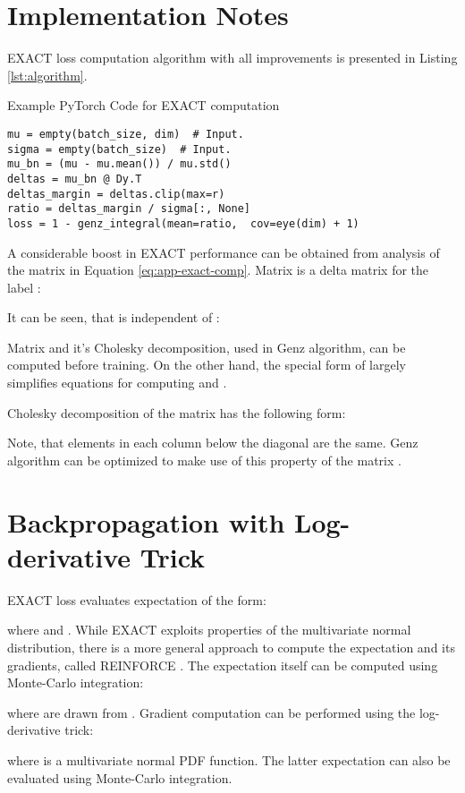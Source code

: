 \documentclass[nohyperref]{article}
\theoremstyle{plain}
\theoremstyle{definition}
\theoremstyle{remark}
\begin{document}
\section{Implementation Notes}
EXACT loss computation algorithm with all improvements is presented in Listing \ref{lst:algorithm}.



\begin{listing}[h]\caption{Example PyTorch Code for EXACT computation}\label{lst:algorithm}\begin{lstlisting}
mu = empty(batch_size, dim)  # Input.
sigma = empty(batch_size)  # Input.
mu_bn = (mu - mu.mean()) / mu.std()
deltas = mu_bn @ Dy.T
deltas_margin = deltas.clip(max=r)
ratio = deltas_margin / sigma[:, None]
loss = 1 - genz_integral(mean=ratio,  cov=eye(dim) + 1)
\end{lstlisting}
\end{listing}


A considerable boost in EXACT performance can be obtained from analysis of the matrix  in Equation \ref{eq:app-exact-comp}. Matrix  is a delta matrix for the label :

It can be seen, that  is independent of :

Matrix  and it's Cholesky decomposition, used in Genz algorithm, can be computed before training. On the other hand, the special form of  largely simplifies equations for computing  and .

Cholesky decomposition of the matrix  has the following form:

Note, that elements in each column below the diagonal are the same. Genz algorithm can be optimized to make use of this property of the matrix .

\section{Backpropagation with Log-derivative Trick}

EXACT loss evaluates expectation of the form:

where  and .
While EXACT exploits properties of the multivariate normal distribution, there is a more general approach to compute the expectation and its gradients, called REINFORCE \cite{williams1992reinforce}. The expectation itself can be computed using Monte-Carlo integration:

where  are drawn from . Gradient computation can be performed using the log-derivative trick:

where  is a multivariate normal PDF function. The latter expectation can also be evaluated using Monte-Carlo integration.
\end{document}
